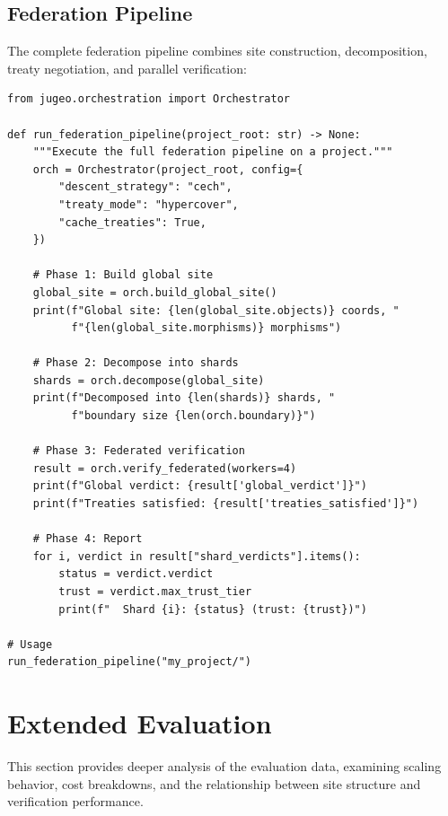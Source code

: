 \documentclass[11pt]{article}
\begin{document}
\subsection{Federation Pipeline}

The complete federation pipeline combines site construction,
decomposition, treaty negotiation, and parallel verification:

\begin{lstlisting}[style=jugeo-python]
from jugeo.orchestration import Orchestrator

def run_federation_pipeline(project_root: str) -> None:
    """Execute the full federation pipeline on a project."""
    orch = Orchestrator(project_root, config={
        "descent_strategy": "cech",
        "treaty_mode": "hypercover",
        "cache_treaties": True,
    })
    
    # Phase 1: Build global site
    global_site = orch.build_global_site()
    print(f"Global site: {len(global_site.objects)} coords, "
          f"{len(global_site.morphisms)} morphisms")
    
    # Phase 2: Decompose into shards
    shards = orch.decompose(global_site)
    print(f"Decomposed into {len(shards)} shards, "
          f"boundary size {len(orch.boundary)}")
    
    # Phase 3: Federated verification
    result = orch.verify_federated(workers=4)
    print(f"Global verdict: {result['global_verdict']}")
    print(f"Treaties satisfied: {result['treaties_satisfied']}")
    
    # Phase 4: Report
    for i, verdict in result["shard_verdicts"].items():
        status = verdict.verdict
        trust = verdict.max_trust_tier
        print(f"  Shard {i}: {status} (trust: {trust})")

# Usage
run_federation_pipeline("my_project/")
\end{lstlisting}


\section{Extended Evaluation}\label{sec:extended-eval}

This section provides deeper analysis of the evaluation data,
examining scaling behavior, cost breakdowns, and the relationship
between site structure and verification performance.
\end{document}
